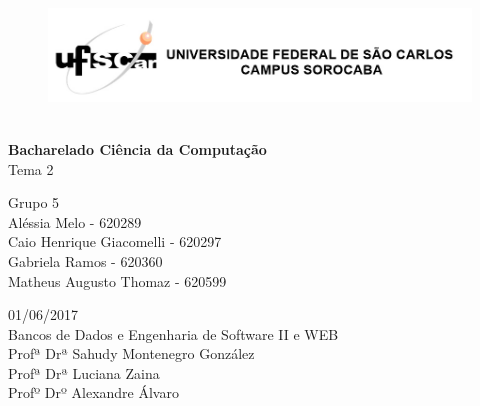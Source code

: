 \documentclass[
	12pt,				%
	oneside,			%
	a4paper,			%
	brazil				%
	]{abntex2}
\begin{document}

\frenchspacing 







\begin{center}

\begin{figure}[!htb]
\includegraphics[width=1.1\textwidth]{USFCAR_-_logo.jpg}\

\end{figure}


\vspace{80pt}
\LARGE{\textbf{Bacharelado Ciência da Computação}}\\
\LARGE{Tema 2}\\
\LARGE{ }

\vspace{50pt}
\textbf{\Huge{}}

\end{center}
	
\begin{flushleft}
		
\begin{center}
{\Large 	Grupo 5\\
			 Aléssia Melo - 620289\\
			 Caio Henrique Giacomelli - 620297\\
  			 Gabriela Ramos - 620360\\
  			 Matheus Augusto Thomaz - 620599\\}
\end{center}
        
\vspace{70pt}

 \begin{center}

{\large { 01/06/2017 \\Bancos de Dados e Engenharia de Software II e WEB } \\
Profª Drª Sahudy Montenegro González\\
Profª Drª Luciana Zaina \\
Profº Drº Alexandre Álvaro} 
                    
\end{center}
        
\end{flushleft}	
  
\end{document}
